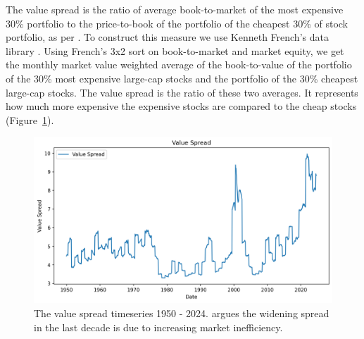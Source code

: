 The value spread is the ratio of average book-to-market of the most expensive 30\% portfolio to the price-to-book of the portfolio of the cheapest 30\% of stock portfolio, as per \citet{fama_french_1993}.
To construct this measure we use Kenneth French's data library \citep{french_website}. 
Using French's 3x2 sort on book-to-market and market equity, we get the monthly market value weighted average of the book-to-value of the portfolio of the 30\% most expensive large-cap stocks and the portfolio of the 30\% cheapest large-cap stocks. The value spread is the ratio of these two averages.
It represents how much more expensive the expensive stocks are compared to the cheap stocks (Figure~\ref{fig:value_spread}).

\begin{figure}[h!]
    \centering
    \includegraphics[width=1\textwidth]{../figs/Value Spread.png}
    \caption{The value spread timeseries 1950 - 2024. \citet{asness_2024} argues the widening spread in the last decade is due to increasing market inefficiency.}
    \label{fig:value_spread}
\end{figure}